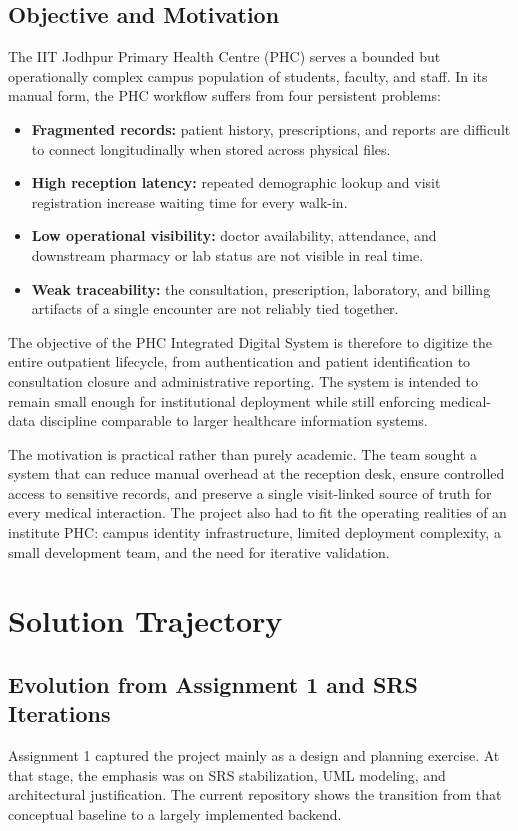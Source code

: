 \documentclass[conference]{IEEEtran}
\begin{document}
\subsection{Objective and Motivation}
The IIT Jodhpur Primary Health Centre (PHC) serves a bounded but operationally complex campus population of students, faculty, and staff. In its manual form, the PHC workflow suffers from four persistent problems:
\begin{itemize}
    \item \textbf{Fragmented records:} patient history, prescriptions, and reports are difficult to connect longitudinally when stored across physical files.
    \item \textbf{High reception latency:} repeated demographic lookup and visit registration increase waiting time for every walk-in.
    \item \textbf{Low operational visibility:} doctor availability, attendance, and downstream pharmacy or lab status are not visible in real time.
    \item \textbf{Weak traceability:} the consultation, prescription, laboratory, and billing artifacts of a single encounter are not reliably tied together.
\end{itemize}

The objective of the PHC Integrated Digital System is therefore to digitize the entire outpatient lifecycle, from authentication and patient identification to consultation closure and administrative reporting. The system is intended to remain small enough for institutional deployment while still enforcing medical-data discipline comparable to larger healthcare information systems.

The motivation is practical rather than purely academic. The team sought a system that can reduce manual overhead at the reception desk, ensure controlled access to sensitive records, and preserve a single visit-linked source of truth for every medical interaction. The project also had to fit the operating realities of an institute PHC: campus identity infrastructure, limited deployment complexity, a small development team, and the need for iterative validation.

\section{Solution Trajectory}
\subsection{Evolution from Assignment 1 and SRS Iterations}
Assignment 1 captured the project mainly as a design and planning exercise. At that stage, the emphasis was on SRS stabilization, UML modeling, and architectural justification. The current repository shows the transition from that conceptual baseline to a largely implemented backend.
\end{document}
